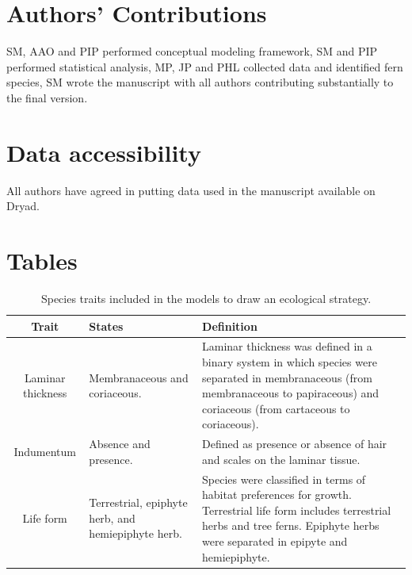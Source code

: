 \documentclass[12pt]{article}
\begin{document}
\section*{Authors' Contributions} 
SM, AAO and PIP performed conceptual modeling framework, SM and PIP performed statistical analysis, MP, JP and PHL collected data and identified fern species, SM wrote the manuscript with all authors contributing substantially to the final version. %

\section*{Data accessibility} 
All authors have agreed in putting data used in the manuscript available on Dryad.




\newpage 


\section*{Tables}


\begin{table}[!hb]
    \caption{ Species traits included in the models to draw an ecological strategy.}\label{trait}
  \begin{tabular}{cp{4cm}p{6cm}}
 \toprule	
\bf{Trait}	&	\bf{States}	&	\bf{Definition} 	\\
\hline
Laminar thickness	&	Membranaceous and coriaceous.	&	Laminar thickness was defined in a binary system in which species were separated in membranaceous (from membranaceous to papiraceous) and coriaceous (from cartaceous to coriaceous).	 \\
Indumentum	&	Absence and presence.	&	Defined as presence or absence of hair and scales on the laminar tissue.  \\
Life form	&	Terrestrial, epiphyte herb, and hemiepiphyte herb.	&	Species were classified in terms of habitat preferences for growth. Terrestrial life form includes terrestrial herbs and tree ferns. Epiphyte herbs were separated in epipyte and hemiepiphyte. \\
\bottomrule
\end{tabular}
\end{table}
\end{document}
